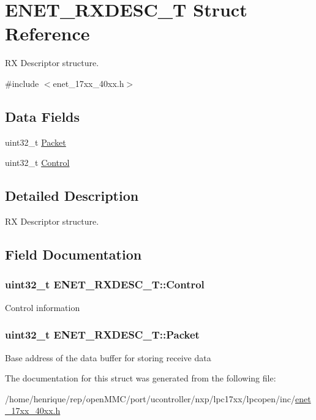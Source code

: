 \hypertarget{structENET__RXDESC__T}{\section{E\-N\-E\-T\-\_\-\-R\-X\-D\-E\-S\-C\-\_\-\-T Struct Reference}
\label{structENET__RXDESC__T}
}


R\-X Descriptor structure.  




{\ttfamily \#include $<$enet\-\_\-17xx\-\_\-40xx.\-h$>$}

\subsection*{Data Fields}
\begin{DoxyCompactItemize}
\item 
uint32\-\_\-t \hyperlink{structENET__RXDESC__T_a6fffb262a03d26e426701e6fba82a7ff}{Packet}
\item 
uint32\-\_\-t \hyperlink{structENET__RXDESC__T_a4e7065600418654b06d854ea66dfe259}{Control}
\end{DoxyCompactItemize}


\subsection{Detailed Description}
R\-X Descriptor structure. 

\subsection{Field Documentation}
\hypertarget{structENET__RXDESC__T_a4e7065600418654b06d854ea66dfe259}{
\subsubsection[{Control}]{\setlength{\rightskip}{0pt plus 5cm}uint32\-\_\-t E\-N\-E\-T\-\_\-\-R\-X\-D\-E\-S\-C\-\_\-\-T\-::\-Control}}\label{structENET__RXDESC__T_a4e7065600418654b06d854ea66dfe259}
Control information \hypertarget{structENET__RXDESC__T_a6fffb262a03d26e426701e6fba82a7ff}{
\subsubsection[{Packet}]{\setlength{\rightskip}{0pt plus 5cm}uint32\-\_\-t E\-N\-E\-T\-\_\-\-R\-X\-D\-E\-S\-C\-\_\-\-T\-::\-Packet}}\label{structENET__RXDESC__T_a6fffb262a03d26e426701e6fba82a7ff}
Base address of the data buffer for storing receive data 

The documentation for this struct was generated from the following file\-:\begin{DoxyCompactItemize}
\item 
/home/henrique/rep/open\-M\-M\-C/port/ucontroller/nxp/lpc17xx/lpcopen/inc/\hyperlink{enet__17xx__40xx_8h}{enet\-\_\-17xx\-\_\-40xx.\-h}\end{DoxyCompactItemize}

